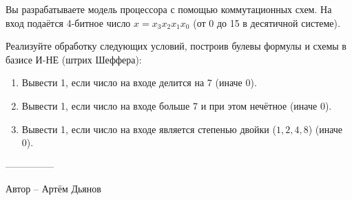 \question
Вы разрабатываете модель процессора с помощью коммутационных схем. На вход подаётся 4-битное число $x=x_3x_2x_1x_0$ (от 0 до 15 в десятичной системе).

Реализуйте обработку следующих условий, построив булевы формулы и схемы в базисе И-НЕ (штрих Шеффера):
\begin{enumerate}
\item Вывести 1, если число на входе делится на 7 (иначе 0).
\item Вывести 1, если число на входе больше 7 и при этом нечётное (иначе 0).
\item Вывести 1, если число на входе является степенью двойки ($1,2,4,8$) (иначе 0).
\end{enumerate}

---------------

Автор -- Артём Дьянов
